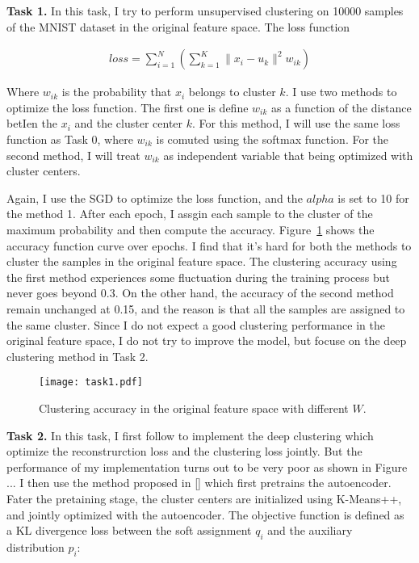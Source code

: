 \documentclass{article}
\begin{document}
\textbf{Task 1.}
\vspace{\baselineskip}
In this task, I try to perform unsupervised clustering on 10000 samples of the MNIST dataset in the original feature space. The loss function

\begin{align*}
  loss = \sum_{i=1}^{N}{\left(\sum_{k=1}^{K}\|x_i-u_k\|^2w_{ik}\right)}
\end{align*}

Where $w_{ik}$ is the probability that $x_i$ belongs to cluster $k$. I use two methods to optimize the loss function. The first one is define $w_{ik}$ as a function of the distance betIen the $x_i$ and the cluster center $k$. For this method, I will use the same loss function as Task 0, where $w_{ik}$ is comuted using the softmax function. For the second method, I will treat $w_{ik}$ as independent variable that being optimized with cluster centers.

Again, I use the SGD to optimize the loss function, and the $alpha$ is set to 10 for the method 1. After each epoch, I assgin each sample to the cluster of the maximum probability and then compute the accuracy. Figure~\ref{fig:task1} shows the accuracy function curve over epochs. I find that it's hard for both the methods to cluster the samples in the original feature space. The clustering accuracy using the first method experiences some fluctuation during the training process but never goes beyond 0.3. On the other hand, the accuracy of the second method remain unchanged at 0.15, and the reason is that all the samples are assigned to the same cluster. Since I do not expect a good clustering performance in the original feature space, I do not try to improve the model, but focuse on the deep clustering method in Task 2.

\begin{figure}[h!]
  \centering
  \texttt{[image: task1.pdf]}
  \caption{Clustering accuracy in the original feature space with different $W$.}
  \label{fig:task1}
\end{figure}


\textbf{Task 2.}
In this task, I first follow \cite{fard2018deep} to implement the deep clustering which optimize the reconstrurction loss and the clustering loss jointly. But the performance of my implementation turns out to be very poor as shown in Figure ... I then use the method proposed in [] which first pretrains the autoencoder. Fater the pretaining stage, the cluster centers are initialized using K-Means++, and jointly optimized with the autoencoder. The objective function is defined as a KL divergence loss between the soft assignment $q_i$ and the auxiliary distribution $p_i$:
\end{document}
